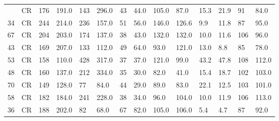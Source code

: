 \begin{longtable}{|l|l|l|l|l|l|l|l|l|l|l|l|l|l|}
\hline
\endfoot
 30 &    CR &                         176 &                    191.0 &                     143 &                296.0 &            43 &       44.0 &         105.0 &       87.0 &              15.3 & 21.9 &                91 &           84.0 \\
  34 &    CR &                         244 &                    214.0 &                     236 &                157.0 &            51 &       56.0 &         146.0 &      126.6 &               9.9 & 11.8 &                87 &           95.0 \\
  67 &    CR &                         204 &                    203.0 &                     174 &                137.0 &            38 &       43.0 &         132.0 &      132.0 &              10.0 & 11.6 &               106 &           96.0 \\
  43 &    CR &                         169 &                    207.0 &                     133 &                112.0 &            49 &       64.0 &          93.0 &      121.0 &              13.0 & 8.8 &                85 &           78.0 \\
  53 &    CR &                         158 &                    110.0 &                     428 &                317.0 &            37 &       37.0 &         121.0 &       99.0 &              43.2 &                47.8 &               108 &          112.0 \\
  48 &    CR &                         160 &                    137.0 &                     212 &                334.0 &            35 &       30.0 &          82.0 &       41.0 &              15.4 & 18.7 &               102 &          103.0 \\
  70 &    CR &                         149 &                    128.0 &                      77 &                 84.0 &            44 &       29.0 &          89.0 &       83.0 &              22.1 & 12.5 &               103 &          101.0 \\
  58 &    CR &                         182 &                    184.0 &                     241 &                228.0 &            38 &       34.0 &          96.0 &      104.0 &              10.0 & 11.9 &               106 &          113.0 \\
  36 &    CR &                         188 &                    202.0 &                      82 &                 68.0 &            67 &       82.0 &         105.0 &      106.0 &               5.4 & 4.7 &                87 &           92.0 \\

\end{longtable}
